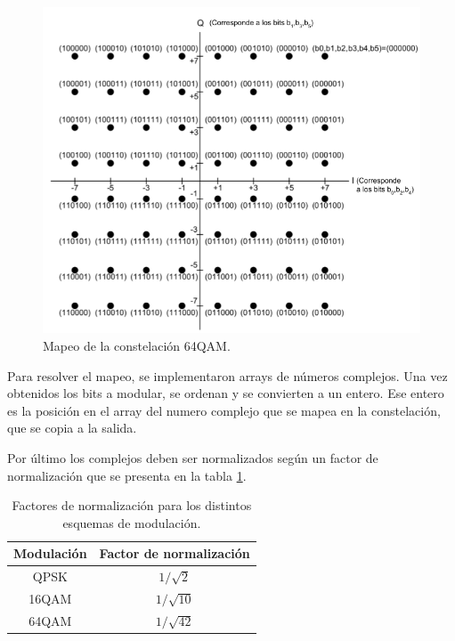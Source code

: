 \begin{figure}[!h]
\centering
\includegraphics[scale=0.5]{figuras/cap05/constelacion_64QAM}
\caption{\label{f:mapeo_64QAM} Mapeo de la constelaci\'on 64QAM.}
\end{figure}

Para resolver el mapeo, se implementaron arrays de números complejos. Una vez obtenidos los bits a modular, se ordenan y se convierten a un entero. Ese entero es la posición en el array del numero complejo que se mapea en la constelación, que se copia a la salida.

Por \'ultimo los complejos deben ser normalizados seg\'un un factor de normalizaci\'on que se presenta en la tabla \ref{t:factor_normalizacion}.

\begin{table}[h!]
\centering
\begin{tabular}{|c|c|}
\hline
\textbf{Modulaci\'on} 				& \textbf{Factor de normalizaci\'on}\\
\hline
QPSK 		& $1/ \sqrt{2}$\\
\hline
16QAM		& $1/ \sqrt{10}$ \\
\hline
64QAM 		& $1/ \sqrt{42}$ \\
\hline
\end{tabular}
\caption{\label{t:factor_normalizacion} Factores de normalizaci\'on para los distintos esquemas de modulaci\'on.}
\end{table}



